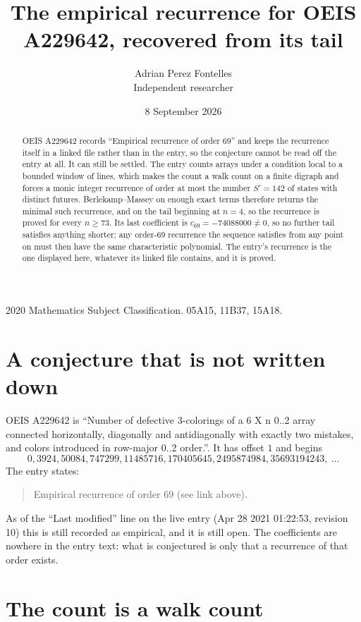 \documentclass[11pt,a4paper]{article}
\title{The empirical recurrence for OEIS A229642, recovered from its tail}
\author{Adrian Perez Fontelles\\ \small Independent researcher}
\date{8 September 2026}
\theoremstyle{plain}
\theoremstyle{definition}
\begin{document}
\maketitle

\begin{abstract}
OEIS A229642 records ``Empirical recurrence of order $69$'' and keeps the recurrence itself in
a linked file rather than in the entry, so the conjecture cannot be read off the entry at all.
It can still be settled. The entry counts arrays under a condition local to a bounded window of
lines, which makes the count a walk count on a finite digraph and forces a monic integer
recurrence of order at most the number $S'=142$ of states with distinct futures. Berlekamp--Massey on
enough exact terms therefore returns the minimal such recurrence, and on the tail beginning at $n=4$, so the recurrence is proved for every $n\ge73$.
Its last coefficient is $c_{69}=-74088000\neq0$, so no further tail satisfies anything
shorter; any order-$69$ recurrence the sequence satisfies from any point on must then have
the same characteristic polynomial. The entry's recurrence is the one displayed here, whatever
its linked file contains, and it is proved.
\end{abstract}

\noindent\small 2020 Mathematics Subject Classification. 05A15, 11B37, 15A18.\normalsize

\section{A conjecture that is not written down}

OEIS A229642 is ``Number of defective 3-colorings of a 6 X n 0..2 array connected horizontally, diagonally and antidiagonally with exactly two mistakes, and colors introduced in row-major 0..2 order.''. It has offset $1$ and begins
\[
0, 3924, 50084, 747299, 11485716, 170405645, 2495874984, 35693194243,\ \dots
\]
The entry states:
\begin{quote}
Empirical recurrence of order 69 (see link above).
\end{quote}
As of the ``Last modified'' line on the live entry (Apr 28 2021 01:22:53, revision 10)
this is still recorded as empirical, and it is still open. The coefficients are nowhere in the
entry text: what is conjectured is only that a recurrence of that order exists.

\section{The count is a walk count}
\end{document}

